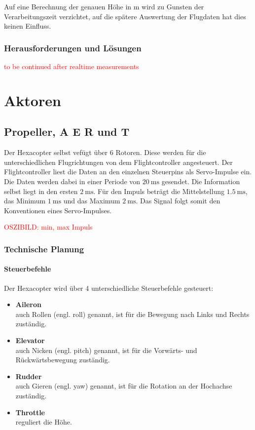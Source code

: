   Auf eine Berechnung der genauen Höhe in m wird zu Gunsten der Verarbeitungszeit verzichtet, auf die spätere Auswertung der Flugdaten hat dies keinen Einfluss.

  \subsection{Herausforderungen und Lösungen}
  \textcolor{red}{to be continued after realtime measurements}

\chapter{Aktoren}
\renewcommand{\kapitelautor}{Autor: Lucas Ullrich}

\section{Propeller, A E R und T}
Der Hexacopter selbst vefügt über 6 Rotoren. Diese werden für die unterschiedlichen Flugrichtungen von dem Flightcontroller angesteuert.
Der Flightcontroller liest die Daten an den einzelnen Steuerpins als Servo-Impulse ein. Die Daten werden dabei in einer Periode von $\SI{20}{\milli\second}$ gesendet.
Die Information selbst liegt in den ersten $\SI{2}{\milli\second}$. Für den Impuls beträgt die Mittelstellung $\SI{1.5}{\milli\second}$, das Minimum $\SI{1}{\milli\second}$
und das Maximum $\SI{2}{\milli\second}$. Das Signal folgt somit den Konventionen eines Servo-Impulses.

\textcolor{red}{OSZIBILD: min, max Impuls}

  \subsection{Technische Planung}
    \subsubsection{Steuerbefehle}
    Der Hexacopter wird über 4 unterschiedliche Steuerbefehle gesteuert:

    \begin{itemize}
      \item \textbf{Aileron}\\
      auch Rollen (engl. roll) genannt, ist für die Bewegung nach Links und Rechts zuständig.

      \item \textbf{Elevator}\\
      auch Nicken (engl. pitch) genannt, ist für die Vorwärts- und Rückwärtsbewegung zuständig.

      \item \textbf{Rudder}\\
      auch Gieren (engl. yaw) genannt, ist für die Rotation an der Hochachse zuständig.

      \item \textbf{Throttle}\\
      reguliert die Höhe.

    \end{itemize}

